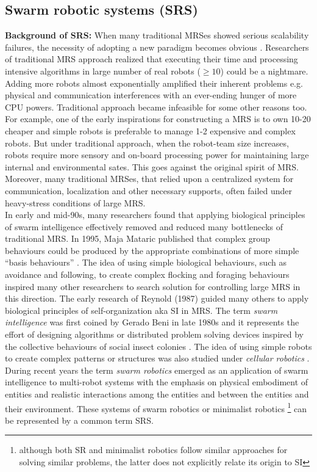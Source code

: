 \subsection{Swarm robotic systems (SRS)}
\label{bg:mrs:srs}
\textbf{Background of SRS:} When many traditional MRSes showed serious  scalability failures, the necessity of adopting a  new paradigm becomes obvious \cite{Lerman+2006}. Researchers of traditional MRS approach realized  that  executing their time and processing intensive algorithms in large number of real robots ($\geq 10$) could be a nightmare. Adding more robots almost exponentially amplified their inherent  problems e.g. physical and communication interferences with an ever-ending hunger of more CPU powers. Traditional approach became infeasible for some other reasons too. For example, one of the early inspirations for constructing a MRS is to own 10-20 cheaper and simple robots is preferable to manage 1-2 expensive and complex robots. But under traditional approach, when the robot-team size increases,  robots require more sensory and on-board processing power for maintaining large internal and environmental sates. This goes against the original spirit of MRS. Moreover, many traditional MRSes, that relied upon a centralized system for communication, localization and other necessary supports,  often failed under heavy-stress conditions of large MRS.\\
In early and mid-90s, many researchers found that applying biological principles of swarm intelligence effectively removed and reduced many bottlenecks of traditional MRS.  In 1995, Maja Mataric published that complex group behaviours could be produced by the appropriate combinations of more simple ``basis behaviours'' \cite{Mataric1995}. The idea of using simple biological behaviours, such as avoidance and following, to create complex flocking and foraging behaviours inspired many other researchers to search solution for controlling large MRS in this direction.  The early research of Reynold (1987) guided many others to apply biological principles of self-organization aka \acf{SI} in MRS.  The term {\em swarm intelligence} was first coined by Gerado Beni \cite{Beni2005} in late 1980s and it represents the effort of designing algorithms or distributed problem solving devices inspired by the collective behaviours of social insect colonies \cite{Bonabeau+1999}. The idea of using simple robots to create complex patterns or structures was also studied under {\em cellular robotics} \cite{Fukuda+1987}. During recent years the term {\em swarm robotics} emerged as an application of swarm intelligence to multi-robot systems with the emphasis on physical embodiment of entities and realistic interactions among the entities and between the entities and their environment. These systems of swarm robotics or minimalist robotics \footnote{although both SR and minimalist robotics follow similar approaches for solving similar problems, the latter does not explicitly relate its origin to SI} can be represented by a common term SRS.\\
